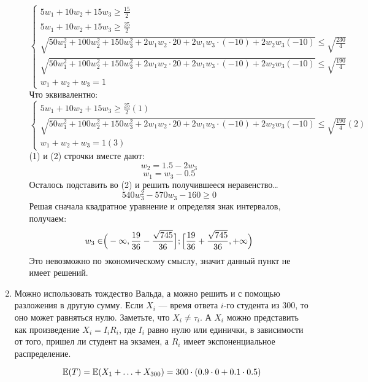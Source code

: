 \begin{enumerate}
\begin{enumerate}
	\begin{equation*}
	\begin{cases}
	5w_{1} + 10w_{2} + 15w_{3} \ge \frac{15}{2}\\
	5w_{1} + 10w_{2} + 15w_{3} \ge \frac{25}{2}\\
	\sqrt{50w_{1}^{2} + 100w_{2}^{2} + 150w_{3}^{2} +2w_{1}w_{2}\cdot20 + 2w_{1}w_{3}\cdot(-10) + 2w_{2}w_{3}(-10)} \le \sqrt{\frac{230}{4}}\\
	\sqrt{50w_{1}^{2} + 100w_{2}^{2} + 150w_{3}^{2} +2w_{1}w_{2}\cdot20 + 2w_{1}w_{3}\cdot(-10) + 2w_{2}w_{3}(-10)} \le \sqrt{\frac{190}{4}}\\
	w_{1} + w_{2} + w_{3} = 1
	\end{cases}
	\end{equation*}
	Что эквивалентно:
	\begin{equation*}
	\begin{cases}
	5w_{1} + 10w_{2} + 15w_{3} \ge \frac{25}{2} (1)\\
	\sqrt{50w_{1}^{2} + 100w_{2}^{2} + 150w_{3}^{2} +2w_{1}w_{2}\cdot20 + 2w_{1}w_{3}\cdot(-10) + 2w_{2}w_{3}(-10)} \le \sqrt{\frac{190}{4}} (2)\\
	w_{1} + w_{2} + w_{3} = 1 (3)
	\end{cases}
	\end{equation*}
	(1) и (2) строчки вместе дают:
	\[w_{2} = 1.5 - 2w_{3}\]
	\[w_{1} = w_{3} - 0.5\]
	Осталось подставить во (2) и решить получившееся неравенство\ldots
	\[540w_{3}^{2} - 570w_{3} - 160 \ge 0\]
	Решая сначала квадратное уравнение и определяя знак интервалов, получаем:
	\[w_{3} \in \Bigr(-\infty, \frac{19}{36} - \frac{\sqrt{745}}{36}\Bigl]; \Bigl[\frac{19}{36} + \frac{\sqrt{745}}{36}, +\infty\Bigl)\]
	Это невозможно по экономическому смыслу, значит данный пункт не имеет решений.
\end{enumerate}

\item Можно использовать тождество Вальда, а можно решить и с помощью разложения в другую сумму. 
Если $X_i$ — время ответа $i$-го студента из 300, то оно может равняться нулю.
Заметьте, что $X_i \neq \tau_i$. А $X_i$ можно представить как произведение
$X_i = I_i R_i$, где $I_i$ равно нулю или единички, в зависимости от того, пришел ли студент на экзамен,
а $R_i$ имеет экспоненциальное распределение. 

\[
\operatorname{\mathbb{E}}(T) = \operatorname{\mathbb{E}}(X_1 + \ldots + X_{300}) = 300 \cdot (0.9\cdot 0 + 0.1 \cdot 0.5)
\]

\end{enumerate}

